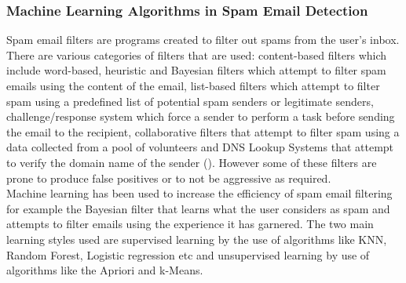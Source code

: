 \subsubsection{Machine Learning Algorithms in Spam Email Detection}
Spam email filters are programs created to filter out spams from the user's inbox. There are various categories of filters that are used: content-based filters which include  word-based, heuristic and Bayesian filters which attempt to filter spam emails using the content of the email, list-based filters which attempt to filter spam using a predefined list of potential spam senders or legitimate senders, challenge/response system which force a sender to perform a task before sending the email to the recipient, collaborative filters that attempt to filter spam using a data collected from a pool of volunteers and DNS Lookup Systems that attempt to verify the domain name of the sender (\cite{tewari_jangale_2016}). However some of these filters are prone to produce false positives or to not be aggressive as required.\\
Machine learning has been used to increase the efficiency of spam email filtering for example the Bayesian filter that learns what the user considers as spam and attempts to filter emails using the experience it has garnered. The two main learning styles used are supervised learning by the use of algorithms like KNN, Random Forest, Logistic regression etc and unsupervised learning by use of algorithms like the Apriori and k-Means.